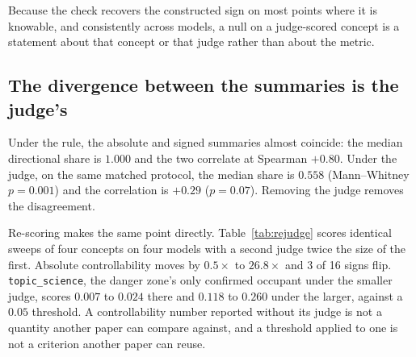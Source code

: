 \documentclass{article}
\begin{document}
Because the check recovers the constructed sign on most points where it is
knowable, and consistently across models, a null on a judge-scored concept is a
statement about that concept or that judge rather than about the metric.

\subsection{The divergence between the summaries is the judge's}
\label{sec:judgedep}

Under the rule, the absolute and signed summaries almost coincide: the median
directional share is $1.000$ and the two correlate at Spearman $+0.80$. Under
the judge, on the same matched protocol, the median share is $0.558$
(Mann--Whitney $p=0.001$) and the correlation is $+0.29$ ($p=0.07$). Removing the
judge removes the disagreement.

Re-scoring makes the same point directly. Table~\ref{tab:rejudge} scores
identical sweeps of four concepts on four models with a second judge twice the
size of the first. Absolute controllability moves by $0.5\times$ to
$26.8\times$ and 3 of 16 signs flip. \texttt{topic\_science}, the danger zone's
only confirmed occupant under the smaller judge, scores $0.007$ to $0.024$ there
and $0.118$ to $0.260$ under the larger, against a $0.05$ threshold. A
controllability number reported without its judge is not a quantity another
paper can compare against, and a threshold applied to one is not a criterion
another paper can reuse.
\end{document}
